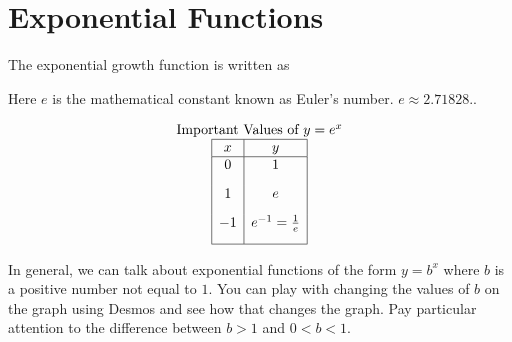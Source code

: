 \documentclass[nooutcomes]{ximera}
\begin{document}
\newpage


\section{Exponential Functions}
The exponential growth function is written as

\begin{center}
\end{center}

Here $e$ is the mathematical constant known as Euler's number.  $e \approx 2.71828 .$.

\begin{center}
\end{center}

\[
\begin{array}{c}
 \text{Important Values of $y=e^x$} \\
\begin{array}{|c|c|}
\hline
 x & y \\
 \hline 
 0&1\\[2ex]
 1&e\\[2ex]
 -1&e^{-1}=\frac{1}{e}\\[2ex]
\hline
\end{array}
\end{array}
 \]

In general, we can talk about exponential functions of the form $y=b^{x}$ where $b$ is a positive number not equal to $1$.  You can play with changing the values of $b$ on the graph using Desmos and see how that changes the graph.  Pay particular attention to the difference between $b>1$ and $0<b<1$.

\begin{center}  
\end{center}
\end{document}

